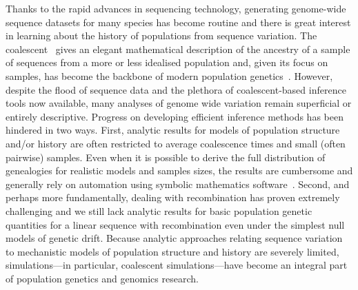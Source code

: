 \documentclass[graybox]{svmult}
\begin{document}
Thanks to the rapid advances in sequencing technology, generating
genome-wide sequence datasets for many species has become routine and
there is great interest in learning about the history of
populations from sequence variation. The
coalescent~\citep{hudson1983testing,kingman1982coalescent,Tajima1983Evolutionary}
gives an
elegant mathematical description of the ancestry of a sample of
sequences from a more or less idealised population and, given its focus
on samples, has become the backbone of modern population
genetics~\citep{hudson1990gene,wakely2008coalescent}.
However, despite the flood of sequence data and the plethora of
coalescent-based inference tools now available, many analyses of genome
wide variation remain superficial or entirely descriptive. Progress on
developing efficient inference methods has been hindered in two ways.
First, analytic results for models of population structure and/or history are
often restricted to average coalescence times and small (often pairwise)
samples. Even when it is possible to derive the full distribution of
genealogies for realistic models and samples sizes, the results are
cumbersome and generally rely on automation using symbolic mathematics software~\citep{Lohse2016}. Second, and
perhaps more fundamentally, dealing with recombination has proven
extremely challenging and we still lack analytic results for basic population genetic quantities for a linear sequence with recombination even under the simplest null models of
genetic drift.
Because analytic approaches relating sequence variation to mechanistic models
of population structure and history are severely limited, simulations---in particular, coalescent
simulations---have become an integral part of population genetics and genomics research.

\end{document}
